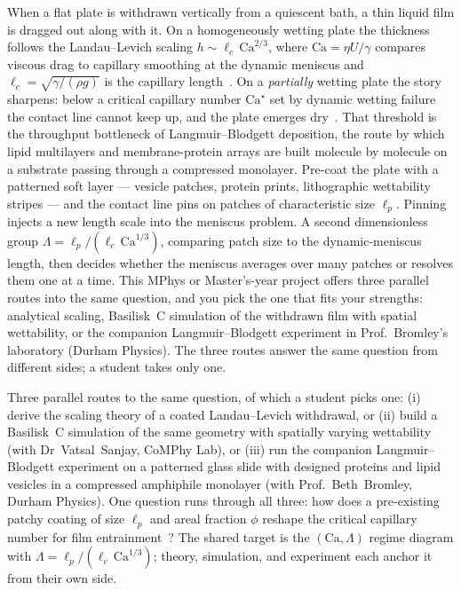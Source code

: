 \documentclass[11pt]{article}
\begin{document}
\noindent When a flat plate is withdrawn vertically from a quiescent bath, a thin liquid film is dragged out along with it. On a homogeneously wetting plate the thickness follows the Landau--Levich scaling $h \sim \ell_c \, \mathrm{Ca}^{2/3}$, where $\mathrm{Ca} = \eta U / \gamma$ compares viscous drag to capillary smoothing at the dynamic meniscus and $\ell_c = \sqrt{\gamma / (\rho g)}$ is the capillary length~\citep{landauLevich1942,quere1999fluid,rioBoulogne2017}. On a \emph{partially} wetting plate the story sharpens: below a critical capillary number $\mathrm{Ca}^\star$ set by dynamic wetting failure the contact line cannot keep up, and the plate emerges dry~\citep{bonnWettingSpreading2009}. That threshold is the throughput bottleneck of Langmuir--Blodgett deposition, the route by which lipid multilayers and membrane-protein arrays are built molecule by molecule on a substrate passing through a compressed monolayer. Pre-coat the plate with a patterned soft layer --- vesicle patches, protein prints, lithographic wettability stripes --- and the contact line pins on patches of characteristic size $\ell_p$. Pinning injects a new length scale into the meniscus problem. A second dimensionless group $\Lambda = \ell_p / (\ell_c \, \mathrm{Ca}^{1/3})$, comparing patch size to the dynamic-meniscus length, then decides whether the meniscus averages over many patches or resolves them one at a time. This MPhys or Master's-year project offers three parallel routes into the same question, and you pick the one that fits your strengths: analytical scaling, Basilisk~C simulation of the withdrawn film with spatial wettability, or the companion Langmuir--Blodgett experiment in Prof.~Bromley's laboratory (Durham Physics). The three routes answer the same question from different sides; a student takes only one.

\begin{tcolorbox}[colback=mgray,colframe=mpurple,title=TL;DR]
Three parallel routes to the same question, of which a student picks one: (i) derive the scaling theory of a coated Landau--Levich withdrawal, or (ii) build a Basilisk~C simulation of the same geometry with spatially varying wettability (with Dr~Vatsal~Sanjay, CoMPhy Lab), or (iii) run the companion Langmuir--Blodgett experiment on a patterned glass slide with designed proteins and lipid vesicles in a compressed amphiphile monolayer (with Prof.~Beth~Bromley, Durham Physics). One question runs through all three: how does a pre-existing patchy coating of size $\ell_p$ and areal fraction $\phi$ reshape the critical capillary number for film entrainment~\citep{bonnWettingSpreading2009}? The shared target is the $(\mathrm{Ca}, \Lambda)$ regime diagram with $\Lambda = \ell_p / (\ell_c \, \mathrm{Ca}^{1/3})$; theory, simulation, and experiment each anchor it from their own side.
\end{tcolorbox}
\end{document}
